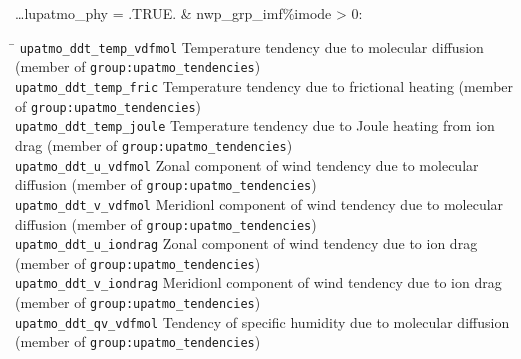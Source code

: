 \ldots lupatmo\_phy = .TRUE. \& nwp\_grp\_imf\%imode > 0:
\begin{tabbing}
\hspace*{0.4\textwidth} \= \kill
\texttt{upatmo\_ddt\_temp\_vdfmol}   \> Temperature tendency due to
molecular diffusion (member of \texttt{group:upatmo\_tendencies}) \\
\texttt{upatmo\_ddt\_temp\_fric}   \> Temperature tendency due to
frictional heating (member of \texttt{group:upatmo\_tendencies}) \\
\texttt{upatmo\_ddt\_temp\_joule}   \> Temperature tendency due to
Joule heating from ion drag (member of \texttt{group:upatmo\_tendencies}) \\
\texttt{upatmo\_ddt\_u\_vdfmol}   \> Zonal component of wind tendency due to
molecular diffusion (member of \texttt{group:upatmo\_tendencies}) \\
\texttt{upatmo\_ddt\_v\_vdfmol}   \> Meridionl component of wind tendency due to
molecular diffusion (member of \texttt{group:upatmo\_tendencies}) \\
\texttt{upatmo\_ddt\_u\_iondrag}   \> Zonal component of wind tendency due to
ion drag (member of \texttt{group:upatmo\_tendencies}) \\
\texttt{upatmo\_ddt\_v\_iondrag}   \> Meridionl component of wind tendency due to
ion drag (member of \texttt{group:upatmo\_tendencies}) \\
\texttt{upatmo\_ddt\_qv\_vdfmol}   \> Tendency of specific humidity due to
molecular diffusion (member of \texttt{group:upatmo\_tendencies}) \\
\end{tabbing}

\newpage

%

%
%


